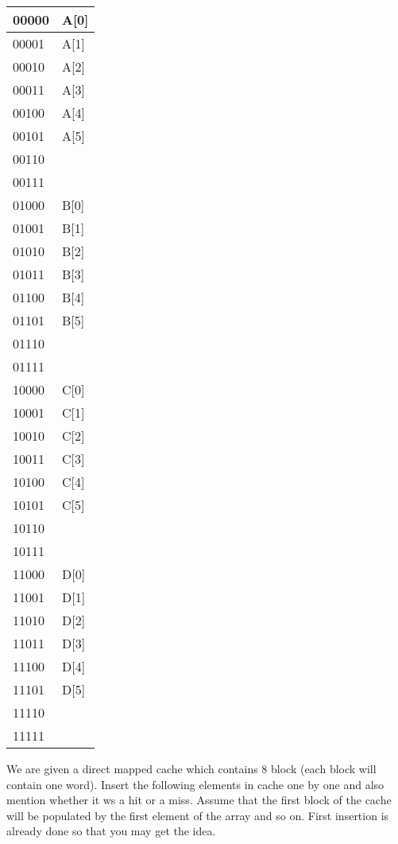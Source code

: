\documentclass[addpoints]{exam}
\begin{document}
\begin{sloppypar}
\begin{questions}
    \begin{tabular}{|l |l |}
        \hline 00000 \hspace*{8mm} & A[0] \hspace*{10mm} \\ \hline
        00001 & A[1] \\ \hline 
        00010 & A[2] \\ \hline
        00011 & A[3] \\ \hline
        00100 & A[4] \\ \hline
        00101 & A[5] \\ \hline
        00110 &  \\ \hline
        00111 &  \\ \hline
        01000 & B[0] \\ \hline
        01001 & B[1] \\ \hline
        01010 & B[2] \\ \hline
        01011 & B[3] \\ \hline
        01100 & B[4] \\ \hline
        01101 & B[5] \\ \hline
        01110 & \\ \hline
        01111 & \\ \hline
        10000 & C[0] \\ \hline
        10001 & C[1] \\ \hline
        10010 & C[2] \\ \hline
        10011 & C[3] \\ \hline
        10100 & C[4] \\ \hline
        10101 & C[5] \\ \hline
        10110 & \\ \hline
        10111 & \\ \hline
        11000 & D[0] \\ \hline
        11001 & D[1] \\ \hline
        11010 & D[2] \\ \hline
        11011 & D[3] \\ \hline
        11100 & D[4] \\ \hline
        11101 & D[5] \\ \hline
        11110 & \\ \hline
        11111 & \\ \hline
    \end{tabular}

    We are given a direct mapped cache which contains 8 block (each block will contain one word). Insert the following elements in cache one by one and also mention whether it ws a hit or a miss. Assume that the first block of the cache will be populated by the first element of the array and so on. First insertion is already done so that you may get the idea.
    

\end{questions}
\end{sloppypar}
\end{document}
